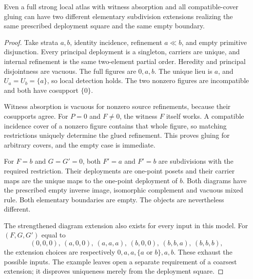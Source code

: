\begin{counterexample}
\label{ex:extension-nonunique}
Even a full strong local atlas with witness absorption and all
compatible-cover gluing can have two different elementary
subdivision extensions realizing the same prescribed deployment
square and the same empty boundary.
\end{counterexample}
\begin{proof}
Take strata $a,b$, identity incidence, refinement $a\ll b$,
and empty primitive disjunction. Every principal deployment is a
singleton, carriers are unique, and internal refinement is the
same two-element partial order. Heredity and principal
disjointness are vacuous. The full figures are $0,a,b$.
The unique lieu is $a$, and $U_a=U_b=\{a\}$, so local
detection holds. The two nonzero figures are incompatible and
both have cosupport $\{0\}$.

Witness absorption is vacuous for nonzero source refinements,
because their cosupports agree. For $P=0$ and $F\ne0$,
the witness $F$ itself works. A compatible incidence cover of a
nonzero figure contains that whole figure, so matching restrictions
uniquely determine the glued refinement. This proves gluing for
arbitrary covers, and the empty case is immediate.

For $F=b$ and $G=G'=0$, both $F'=a$ and $F'=b$ are
subdivisions with the required restriction. Their deployments
are one-point posets and their carrier maps are the unique maps
to the one-point deployment of $b$. Both diagrams have the
prescribed empty inverse image, isomorphic complement and vacuous
mixed rule. Both elementary boundaries are empty. The objects
are nevertheless different.

The strengthened diagram extension also exists for every input
in this model. For $(F,G,G')$ equal to
\[
 (0,0,0),\ (a,0,0),\ (a,a,a),\ (b,0,0),\ (b,b,a),\ (b,b,b),
\]
the extension choices are respectively
$0,a,a,\{a\text{ or }b\},a,b$.
These exhaust the possible inputs. The example leaves open a
separate requirement of a coarsest extension; it disproves
uniqueness merely from the deployment square.
\end{proof}
